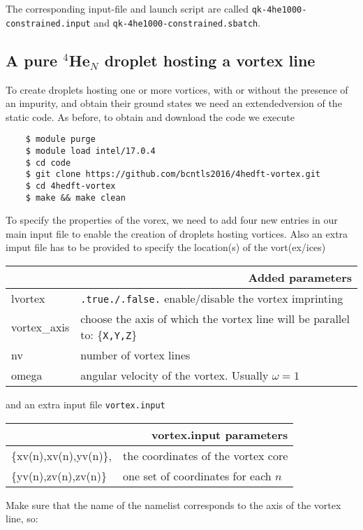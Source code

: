 \documentclass[10pt,a4paper]{article}
\begin{document}
	The corresponding input-file and launch script are called \verb|qk-4he1000-constrained.input| and \verb|qk-4he1000-constrained.sbatch|.
	
	\subsection{A pure $^4$He$_{N}$ droplet hosting a vortex line}
	To create droplets hosting one or more vortices, with or without the presence of an impurity, and obtain their ground states we need an extendedversion of the static code. As before, to obtain and download the code we execute
	\begin{verbatim}
	$ module purge
	$ module load intel/17.0.4
	$ cd code
	$ git clone https://github.com/bcntls2016/4hedft-vortex.git
	$ cd 4hedft-vortex
	$ make && make clean
	\end{verbatim}
	
	To specify the properties of the vorex, we need to add four new entries in our main input file to enable the creation of droplets hosting vortices. Also an extra imput file has to be provided to specify the location(s) of the vort(ex/ices)
	
	\begin{center}
	\begin{tabular}{l|p{9.75cm}}
		\multicolumn{2}{r}{\textbf{Added parameters}} \\
		\hline\hline
		lvortex			&  \verb|.true./.false.| enable/disable the vortex imprinting  \\
		vortex\_axis		&	choose the axis of which the vortex line will be parallel to: \{\verb|X,Y,Z|\} \\
		nv		&	number of vortex lines \\
		omega	&	angular velocity of the vortex. Usually $\omega=1$	
		\end{tabular}
	\end{center}
	\vspace{5px}
	
	and an extra input file \verb|vortex.input|
	
		\begin{center}
		\begin{tabular}{l|p{8.0cm}}
			\multicolumn{2}{r}{\textbf{vortex.input parameters}} \\
			\hline\hline
			\{xv(n),xv(n),yv(n)\},			&  the coordinates of the vortex core  \\
			\{yv(n),zv(n),zv(n)\}		&	one set of coordinates for each $n$ \\
		\end{tabular}
	\end{center}
	\vspace{5px}
	Make sure that the name of the namelist corresponds to the axis of the vortex line, so:
	
\end{document}

